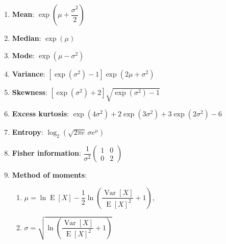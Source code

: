 \begin{enumerate}
    \item \textbf{Mean}: ${\displaystyle \exp \left(\mu +{\dfrac {\sigma ^{2}}{2}}\right)}$
    \hfill \cite{wiki/Log-normal_distribution}

    \item \textbf{Median}: ${\displaystyle \exp(\mu )}$
    \hfill \cite{wiki/Log-normal_distribution}

    \item \textbf{Mode}: ${\displaystyle \exp \left(\mu -\sigma ^{2}\right)}$
    \hfill \cite{wiki/Log-normal_distribution}

    \item \textbf{Variance}:
    ${\displaystyle \left[\exp(\sigma ^{2})-1\right]\exp \left(2\mu +\sigma ^{2}\right)}$
    \hfill \cite{wiki/Log-normal_distribution}

    \item \textbf{Skewness}:
    ${\displaystyle \left[\exp \left(\sigma ^{2}\right)+2\right]{\sqrt {\exp(\sigma ^{2})-1}}}$
    \hfill \cite{wiki/Log-normal_distribution}

    \item \textbf{Excess kurtosis}:
    ${\displaystyle \exp \left(4\sigma ^{2}\right)+2\exp \left(3\sigma ^{2}\right)+3\exp \left(2\sigma ^{2}\right)-6}$
    \hfill \cite{wiki/Log-normal_distribution}

    \item \textbf{Entropy}: ${\displaystyle \log _{2}\left({\sqrt {2\pi e}}\,\sigma e^{\mu }\right)}$
    \hfill \cite{wiki/Log-normal_distribution}

    \item \textbf{Fisher information}:
    ${\displaystyle {\dfrac {1}{\sigma ^{2}}}{\begin{pmatrix}1&0\\0&2\end{pmatrix}}}$
    \hfill \cite{wiki/Log-normal_distribution}

    \item \textbf{Method of moments}:
    \begin{enumerate}
        \item ${\displaystyle \mu =\ln \operatorname {E} [X]-{\dfrac {1}{2}}\ln \left({\dfrac {\operatorname {Var} [X]}{\operatorname {E} [X]^{2}}}+1\right),}$
        \hfill \cite{wiki/Log-normal_distribution}

        \item ${\displaystyle \sigma ={\sqrt {\ln \left({\dfrac {\operatorname {Var} [X]}{\operatorname {E} [X]^{2}}}+1\right)}}}$
        \hfill \cite{wiki/Log-normal_distribution}
    \end{enumerate}


\end{enumerate}
